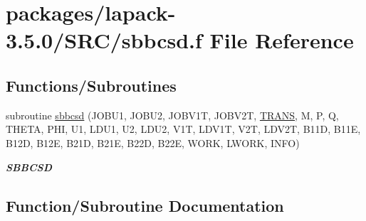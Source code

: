 \hypertarget{sbbcsd_8f}{}\section{packages/lapack-\/3.5.0/\+S\+R\+C/sbbcsd.f File Reference}
\label{sbbcsd_8f}
\subsection*{Functions/\+Subroutines}
\begin{DoxyCompactItemize}
\item 
subroutine \hyperlink{sbbcsd_8f_a95bdd6e44aed23173e9a0c93c32dad78}{sbbcsd} (J\+O\+B\+U1, J\+O\+B\+U2, J\+O\+B\+V1\+T, J\+O\+B\+V2\+T, \hyperlink{superlu__enum__consts_8h_a0c4e17b2d5cea33f9991ccc6a6678d62a1f61e3015bfe0f0c2c3fda4c5a0cdf58}{T\+R\+A\+N\+S}, M, P, Q, T\+H\+E\+T\+A, P\+H\+I, U1, L\+D\+U1, U2, L\+D\+U2, V1\+T, L\+D\+V1\+T, V2\+T, L\+D\+V2\+T, B11\+D, B11\+E, B12\+D, B12\+E, B21\+D, B21\+E, B22\+D, B22\+E, W\+O\+R\+K, L\+W\+O\+R\+K, I\+N\+F\+O)
\begin{DoxyCompactList}\small\item\em {\bfseries S\+B\+B\+C\+S\+D} \end{DoxyCompactList}\end{DoxyCompactItemize}


\subsection{Function/\+Subroutine Documentation}
\hypertarget{sbbcsd_8f_a95bdd6e44aed23173e9a0c93c32dad78}{}
